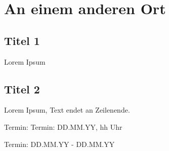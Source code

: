 \documentclass[final]{multiversum}
\begin{document}
\section{An einem anderen Ort}

\subsection{Titel 1}
Lorem Ipsum

\subsection{Titel 2}
Lorem Ipsum, Text endet an Zeilenende.


\begin{termine}
\item Termin: Termin: DD.MM.YY, hh Uhr
  \item Termin: DD.MM.YY - DD.MM.YY
\end{termine}
\impressum
\end{document}
